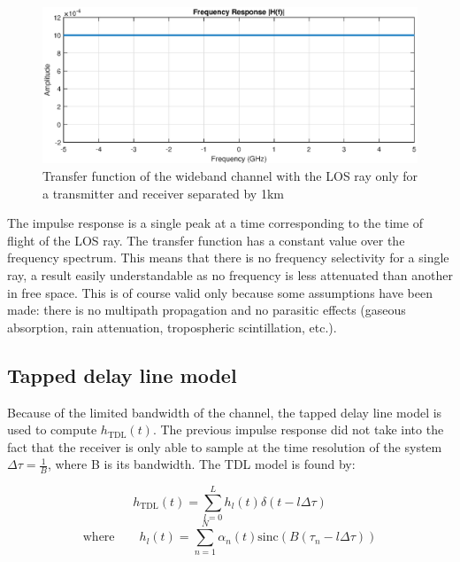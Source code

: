 \documentclass[10pt,a4paper]{ULBreport}
\begin{document}
\begin{figure}[H]
    \centering
    \includegraphics[width=1\textwidth]{4_1_freq.eps}
    \caption{Transfer function of the wideband channel with the LOS ray only for a transmitter and receiver separated by 1km}
    \label{fig:transfer_function}
\end{figure}

The impulse response is a single peak at a time corresponding to the time of flight of the LOS ray. The transfer function has a constant value over the frequency spectrum. This means that there is no frequency selectivity for a single ray, a result easily understandable as no frequency is less attenuated than another in free space. This is of course valid only because some assumptions have been made: there is no multipath propagation and no parasitic effects (gaseous absorption, rain attenuation, tropospheric scintillation, etc.).\smallskip\\

\subsection{Tapped delay line model}
Because of the limited bandwidth of the channel, the tapped delay line model is used to compute $h_{\text{TDL}}(t)$. The previous impulse response did not take into the fact that the receiver is only able to sample at the time resolution of the system $\Delta\tau = \frac{1}{B}$, where B is its bandwidth. The TDL model is found by:

\begin{equation}
    h_{\text{TDL}}(t) = \sum_{l=0}^{L} h_l(t) \delta(t - l\Delta\tau)
    \label{eq:h_TDL}
\end{equation}
\begin{equation*}
    \text{where} \qquad h_l(t) = \sum_{n=1}^{N} \alpha_n(t) \text{sinc}\left(B(\tau_n - l\Delta\tau)\right)
\end{equation*}
\end{document}
